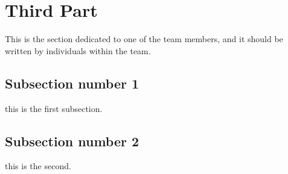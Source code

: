 \documentclass[../main/main.tex]{subfiles}
\begin{document}
\section{Third Part}
This is the section dedicated to one of the team members, and it should be written by individuals within the team.  

\subsection{Subsection number 1}
this is the first subsection.

\subsection{Subsection number 2}
this is the second.
\end{document}
